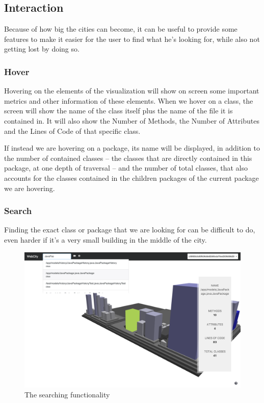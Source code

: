 \documentclass[]{usiinfbachelorproject}
\begin{document}
\subsection{Interaction} \label{Interaction}
Because of how big the cities can become, it can be useful to provide some features to make it easier for the user to find what he's looking for, while also not getting lost by doing so.

\subsubsection{Hover} \label{Hover}
Hovering on the elements of the visualization will show on screen some important metrics and other information of these elements.
When we hover on a class, the screen will show the name of the class itself plus the name of the file it is contained in. It will also show the Number of Methods,
 the Number of Attributes and the Lines of Code of that specific class.

 If instead we are hovering on a package, its name will be displayed, in addition to the number of contained classes -- the classes that are directly contained in this package, at one depth of traversal --
  and the number of total classes, that also accounts for the classes contained in the children packages of the current package we are hovering.

\subsubsection{Search} \label{Search}
Finding the exact class or package that we are looking for can be difficult to do, even harder if it's a very small building in the middle of the city.

\begin{figure} [H]
\centering
\includegraphics[width=1\textwidth]{pictures/search.png}
\caption{The searching functionality}
\label{fig:search}
\end{figure}
\end{document}
